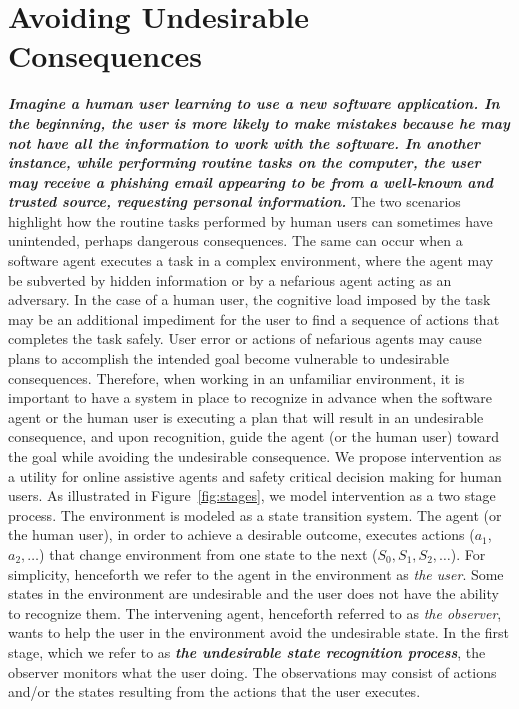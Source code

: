 \chapter{Avoiding Undesirable Consequences}
\textit{\textbf{Imagine a human user learning to use a new software application. In the beginning, the user is more likely to make mistakes because he may not have all the information to work with the software. In another instance, while performing routine tasks on the computer, the user may receive a phishing email appearing to be from a well-known and trusted source, requesting personal information.}}
The two scenarios highlight how the routine tasks performed by human users can sometimes have unintended, perhaps dangerous consequences.
The same can occur when a software agent executes a task in a complex environment, where the agent may be subverted by hidden information or by a nefarious agent acting as an adversary. 
In the case of a human user, the cognitive load imposed by the task may be an additional impediment for the user to find a sequence of actions that completes the task safely.
User error or actions of nefarious agents may cause plans to accomplish the intended goal become vulnerable to undesirable consequences. 
Therefore, when working in an unfamiliar environment, it is important to have a system in place to recognize in advance when the software agent or the human user is executing a plan that will result in an undesirable consequence, and upon recognition, guide the agent (or the human user) toward the goal while avoiding the undesirable consequence. 
We propose intervention as a utility for online assistive agents and safety critical decision making for human users.
As illustrated in Figure~\ref{fig:stages}, we model intervention as a two stage process. 
The environment is modeled as a state transition system. 
The agent (or the human user), in order to achieve a desirable outcome, executes actions ($a_1$, $a_2, \ldots$) that change environment from one state to the next ($S_0, S_1, S_2, \ldots$). 
For simplicity, henceforth we refer to the agent in the environment as \textit{the user}.
Some states in the environment are undesirable and the user does not have the ability to recognize them. 
The intervening agent, henceforth referred to as \textit{the observer}, wants to help the user in the environment avoid the undesirable state.
In the first stage, which we refer to as \textit{\textbf{the undesirable state recognition process}}, the observer monitors what the user doing.
The observations may consist of actions and/or the states resulting from the actions that the user executes. 

